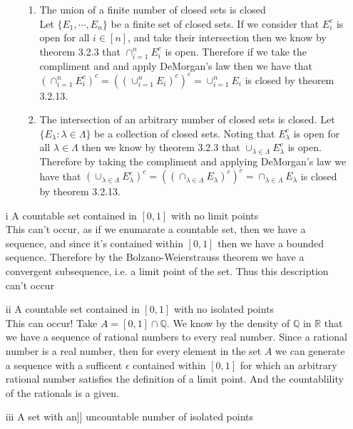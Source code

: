 \documentclass[12pt, letterpaper]{article}
\newcommand{\R}{\mathbb{R}}
\newcommand{\Q}{\mathbb{Q}}
\begin{document}
\begin{enumerate}
\begin{enumerate}
\begin{enumerate}
				\item The union of a finite number of closed sets is closed\\
				Let $\{E_1,\cdots,E_n\}$ be a finite set of closed sets.  
				If we consider that $E_i^c$ is open for all $i \in [n]$, and take their intersection then we know by theorem 3.2.3 that $\cap_{i=1}^n E_i^c$ is open.  Therefore if we take the compliment and and apply DeMorgan's law then we 
				have that $(\cap_{i=1}^n E_i^c)^c = ((\cup_{i=1}^n E_i)^c)^c = \cup_{i = 1}^n E_i$ is closed by theorem 3.2.13.
				\item The intersection of an arbitrary number of closed sets is closed.  Let $\{E_\lambda : \lambda \in \Lambda\}$ be a collection of closed sets.
				Noting that $E_\lambda^c$ is open for all $\lambda \in \Lambda$
				then we know by theorem 3.2.3 that $\cup_{\lambda \in \Lambda} E_{\lambda}^c$ is open.  Therefore by taking the compliment and applying DeMorgan's law we have that $(\cup_{\lambda \in \Lambda} E_{\lambda}^c)^c = 
				((\cap_{\lambda \in \Lambda} E_{\lambda})^c)^c = \cap_{\lambda \in \Lambda} E_{\lambda}$ is closed by theorem 3.2.13.    
			\end{enumerate}
			\end{enumerate}
				
				\iffalse				
				\item[i] A countable set contained in $[0,1]$ with no limit points\\
				This can't occur, as if we enumarate a countable set, then we have
				a sequence, and since it's contained within $[0,1]$ then we have
				a bounded sequence.  Therefore by the Bolzano-Weierstrauss theorem
				we have a convergent subsequence, i.e. a limit point of the set.  
				Thus this description can't occur
				\item[ii]  A countable set contained in $[0,1]$ with no isolated points\\
				This can occur!  Take $A = [0,1] \cap \Q$.  We know by the density of $\Q$ in $\R$ that we have a sequence of rational numbers to every
				real number.  Since a rational number is a real number, then for every element in the set $A$ we can generate a sequence with a sufficent $\epsilon$ contained within $[0,1]$ for which an arbitrary rational number satisfies the definition of a limit point.  And the countablility of the rationals
				is a given.  
				\item[iii] A set with an]] uncountable number of isolated points\\
				

\end{enumerate}
\end{document}
